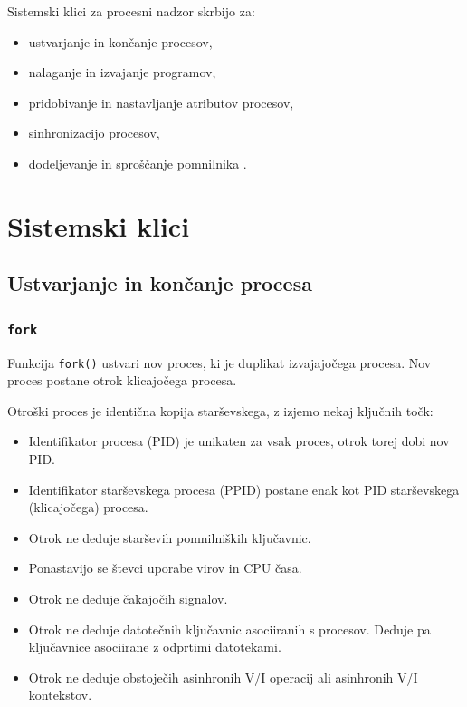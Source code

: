 \documentclass[a4paper,12pt,openright]{book}
\begin{document}
Sistemski klici za procesni nadzor skrbijo za:
\begin{itemize}
	\item ustvarjanje in končanje procesov,
	\item nalaganje in izvajanje programov,
	\item pridobivanje in nastavljanje atributov procesov,
	\item sinhronizacijo procesov,
	\item dodeljevanje in sproščanje pomnilnika \cite{Silberschatz_Galvin_Gagne_2018}.
\end{itemize}

\section{Sistemski klici}

\subsection{Ustvarjanje in končanje procesa}

\subsubsection{\texttt{fork}}

Funkcija \texttt{fork()} ustvari nov proces, ki je duplikat izvajajočega procesa.
Nov proces postane otrok klicajočega procesa.

Otroški proces je identična kopija starševskega, z izjemo nekaj ključnih točk:
\begin{itemize}
	\item Identifikator procesa (PID) je unikaten za vsak proces, otrok torej dobi nov PID.
	\item Identifikator starševskega procesa (PPID) postane enak kot PID starševskega (klicajočega) procesa.
	\item Otrok ne deduje starševih pomnilniških ključavnic.
	\item Ponastavijo se števci uporabe virov in CPU časa.
	\item Otrok ne deduje čakajočih signalov.
	\item Otrok ne deduje datotečnih ključavnic asociiranih s procesov. Deduje pa ključavnice asociirane z odprtimi datotekami.
	\item Otrok ne deduje obstoječih asinhronih V/I operacij ali asinhronih V/I kontekstov.
\end{itemize}
\end{document}
